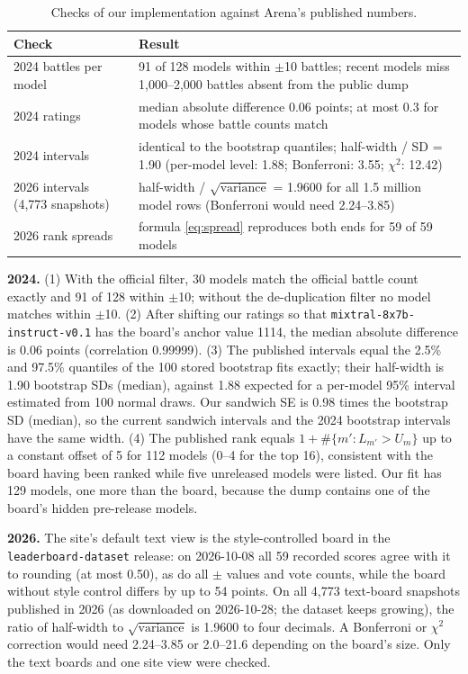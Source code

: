 \documentclass[12pt]{article}
\begin{document}
\begin{table}[!ht]
\centering\small
\caption{Checks of our implementation against Arena's published numbers.}\label{tab:step0}
\begin{tabular}{@{}p{}p{}@{}}
\toprule
Check & Result \\
\midrule
2024 battles per model & 91 of 128 models within $\pm$10 battles; recent models miss 1,000--2,000 battles absent from the public dump \\
2024 ratings & median absolute difference 0.06 points; at most 0.3 for models whose battle counts match \\
2024 intervals & identical to the bootstrap quantiles; half-width / SD = 1.90 (per-model level: 1.88; Bonferroni: 3.55; $\chi^2$: 12.42) \\
2026 intervals (4,773 snapshots) & half-width / $\sqrt{\text{variance}}$ = 1.9600 for all 1.5 million model rows (Bonferroni would need 2.24--3.85) \\
2026 rank spreads & formula \eqref{eq:spread} reproduces both ends for 59 of 59 models \\
\bottomrule
\end{tabular}
\end{table}

\textbf{2024.} (1) With the official filter, 30 models match the official battle count exactly and 91 of 128 within $\pm$10; without the de-duplication filter no model matches within $\pm$10. (2) After shifting our ratings so that \texttt{mixtral-8x7b-instruct-v0.1} has the board's anchor value 1114, the median absolute difference is 0.06 points (correlation 0.99999). (3) The published intervals equal the 2.5\% and 97.5\% quantiles of the 100 stored bootstrap fits exactly; their half-width is 1.90 bootstrap SDs (median), against 1.88 expected for a per-model 95\% interval estimated from 100 normal draws. Our sandwich SE is 0.98 times the bootstrap SD (median), so the current sandwich intervals and the 2024 bootstrap intervals have the same width. (4) The published rank equals $1 + \#\{m' : L_{m'} > U_m\}$ up to a constant offset of 5 for 112 models (0--4 for the top 16), consistent with the board having been ranked while five unreleased models were listed. Our fit has 129 models, one more than the board, because the dump contains one of the board's hidden pre-release models.

\textbf{2026.} The site's default text view is the style-controlled board in the \texttt{leaderboard-dataset} release: on 2026-10-08 all 59 recorded scores agree with it to rounding (at most 0.50), as do all $\pm$ values and vote counts, while the board without style control differs by up to 54 points. On all 4,773 text-board snapshots published in 2026 (as downloaded on 2026-10-28; the dataset keeps growing), the ratio of half-width to $\sqrt{\text{variance}}$ is 1.9600 to four decimals. A Bonferroni or $\chi^2$ correction would need 2.24--3.85 or 2.0--21.6 depending on the board's size. Only the text boards and one site view were checked.
\end{document}

